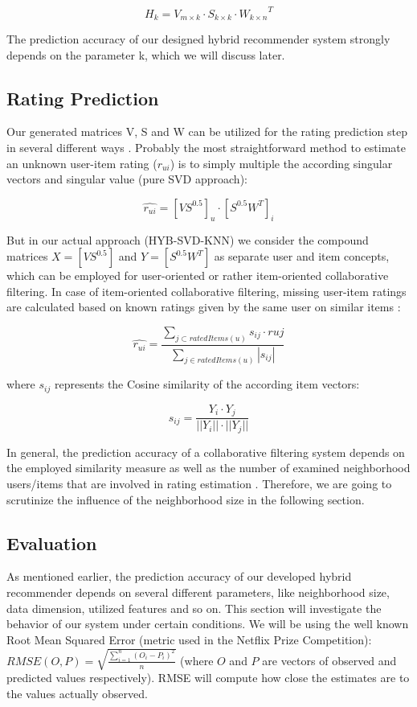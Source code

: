 \documentclass[11pt,letterpaper]{article}
\begin{document}
$$H_k = V_{m\times k}\cdot S_{k\times k}\cdot {W_{k\times n}}^T$$

The prediction accuracy of our designed hybrid recommender system strongly depends on the parameter k, which we will discuss later.

\subsection{Rating Prediction}

Our generated matrices V, S and W can be utilized for the rating prediction step in several different ways \cite{9}. Probably the most straightforward method to estimate an unknown user-item rating ($r_{ui}$) is to simply multiple the according singular vectors and singular value (pure SVD approach):

$$ \hat{r_{ui}} = [VS^{0.5}]_u \cdot [S^{0.5}W^T]_i$$

But in our actual approach (HYB-SVD-KNN) we consider the compound matrices $ X = [VS^{0.5}]$ and $Y = [S^{0.5}W^T]$ as separate user and item concepts, which can be employed for user-oriented or rather item-oriented collaborative filtering. In case of item-oriented collaborative filtering, missing user-item ratings are calculated based on known ratings given by the same user on similar items \cite{10,8}:

$$\hat{r_{ui}} = \frac{\sum_{j\subset ratedItems(u)} s_{ij}\cdot r{uj}}{\sum_{j\in ratedItems(u)} |s_{ij}|}$$

where $s_{ij}$ represents the Cosine similarity of the according item vectors:

$$s_{ij} = \frac{Y_i\cdot Y_j}{||Y_i|| \cdot ||Y_j||}$$

In general, the prediction accuracy of a collaborative filtering system depends on the employed similarity measure as well as the number of examined neighborhood users/items that are involved in rating estimation \cite{12}. Therefore, we are going to scrutinize the influence of the neighborhood size in the following section.


\subsection{Evaluation}

As mentioned earlier, the prediction accuracy of our developed hybrid recommender depends on several different parameters, like neighborhood size, data dimension, utilized features and so on. This section will investigate the behavior of our system under certain conditions. We will be using the well known Root Mean Squared Error (metric used in the Netflix Prize Competition): $RMSE(O,P) = \sqrt{\frac{\sum_{i=1}^{n} (O_{i} - P_{i})^{2}}{n}}$ (where $O$ and $P$ are vectors of observed and predicted values respectively). RMSE will compute how close the estimates are to the values actually observed.\\
\end{document}
